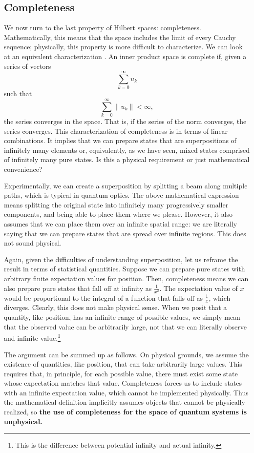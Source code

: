 \documentclass[10pt,twocolumn, nofootinbib]{revtex4-2}
\begin{document}
\subsection{Completeness}

We now turn to the last property of Hilbert spaces: completeness. Mathematically, this means that the space includes the limit of every Cauchy sequence; physically, this property is more difficult to characterize. We can look at an equivalent characterization \cite[Theorem 13.8]{roman_2008}. An inner product space is complete if, given a series of vectors
$$ \sum _{k=0}^{\infty }u_{k}$$
such that
$$ \sum _{k=0}^{\infty }\|u_{k}\|<\infty,$$
the series converges in the space. That is, if the series of the norm converges, the series converges. This characterization of completeness is in terms of linear combinations. It implies that we can prepare states that are superpositions of infinitely many elements or, equivalently, as we have seen, mixed states comprised of infinitely many pure states. Is this a physical requirement or just mathematical convenience?

Experimentally, we can create a superposition by splitting a beam along multiple paths, which is typical in quantum optics. The above mathematical expression means splitting the original state into infinitely many progressively smaller components, and being able to place them where we please. However, it also assumes that we can place them over an infinite spatial range: we are literally saying that we can prepare states that are spread over infinite regions. This does not sound physical.

Again, given the difficulties of understanding superposition, let us reframe the result in terms of statistical quantities. Suppose we can prepare pure states with arbitrary finite expectation values for position. Then, completeness means we can also prepare pure states that fall off at infinity as $\frac{1}{x^2}$. The expectation value of $x$ would be proportional to the integral of a function that falls off as $\frac{1}{x}$, which diverges. Clearly, this does not make physical sense. When we posit that a quantity, like position, has an infinite range of possible values, we simply mean that the observed value can be arbitrarily large, not that we can literally observe and infinite value.\footnote{This is the difference between potential infinity and actual infinity.}

The argument can be summed up as follows. On physical grounds, we assume the existence of quantities, like position, that can take arbitrarily large values. This requires that, in principle, for each possible value, there must exist some state whose expectation matches that value. Completeness forces us to include states with an infinite expectation value, which cannot be implemented physically. Thus the mathematical definition implicitly assumes objects that cannot be physically realized, so \textbf{the use of completeness for the space of quantum systems is unphysical.}
\end{document}

